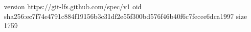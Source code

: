 version https://git-lfs.github.com/spec/v1
oid sha256:ec7f74e4791c884f19156b3c31df2e55f300bd576f46b40f6c7fecee6dca1997
size 1759
